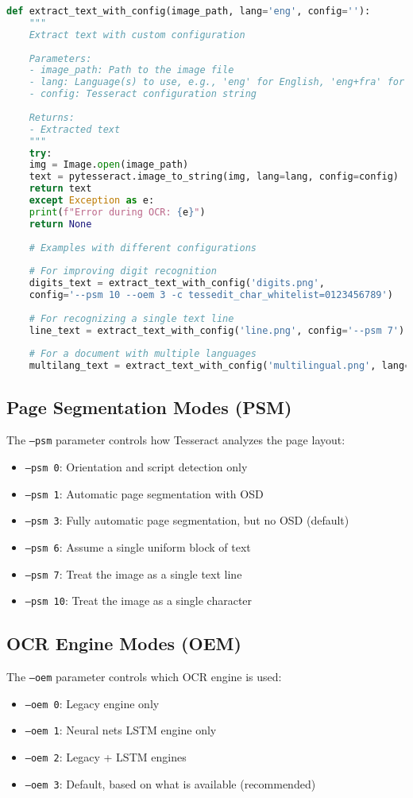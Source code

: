 \begin{lstlisting}[language=Python]
	def extract_text_with_config(image_path, lang='eng', config=''):
	"""
	Extract text with custom configuration
	
	Parameters:
	- image_path: Path to the image file
	- lang: Language(s) to use, e.g., 'eng' for English, 'eng+fra' for English and French
	- config: Tesseract configuration string
	
	Returns:
	- Extracted text
	"""
	try:
	img = Image.open(image_path)
	text = pytesseract.image_to_string(img, lang=lang, config=config)
	return text
	except Exception as e:
	print(f"Error during OCR: {e}")
	return None
	
	# Examples with different configurations
	
	# For improving digit recognition
	digits_text = extract_text_with_config('digits.png', 
	config='--psm 10 --oem 3 -c tessedit_char_whitelist=0123456789')
	
	# For recognizing a single text line
	line_text = extract_text_with_config('line.png', config='--psm 7')
	
	# For a document with multiple languages
	multilang_text = extract_text_with_config('multilingual.png', lang='eng+fra+deu')
\end{lstlisting}

\subsection{Page Segmentation Modes (PSM)}
The \texttt{--psm} parameter controls how Tesseract analyzes the page layout:
\begin{itemize}
	\item \texttt{--psm 0}: Orientation and script detection only
	\item \texttt{--psm 1}: Automatic page segmentation with OSD
	\item \texttt{--psm 3}: Fully automatic page segmentation, but no OSD (default)
	\item \texttt{--psm 6}: Assume a single uniform block of text
	\item \texttt{--psm 7}: Treat the image as a single text line
	\item \texttt{--psm 10}: Treat the image as a single character
\end{itemize}

\subsection{OCR Engine Modes (OEM)}
The \texttt{--oem} parameter controls which OCR engine is used:
\begin{itemize}
	\item \texttt{--oem 0}: Legacy engine only
	\item \texttt{--oem 1}: Neural nets LSTM engine only
	\item \texttt{--oem 2}: Legacy + LSTM engines
	\item \texttt{--oem 3}: Default, based on what is available (recommended)
\end{itemize}

